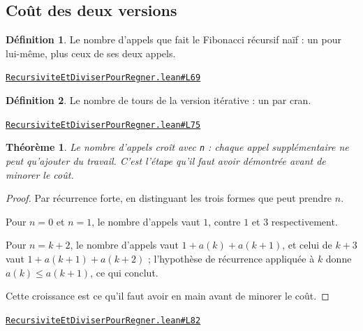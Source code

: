 \documentclass[11pt,a4paper]{article}
\theoremstyle{definition}
\newtheorem{definition}{Définition}
\theoremstyle{plain}
\newtheorem{theoreme}{Théorème}
\newcommand{\source}[2]{\par\smallskip\noindent\hfill{\footnotesize\href{#1}{\texttt{#2}}}\par\smallskip}
\begin{document}
\subsection{Coût des deux versions}

\begin{definition}
Le nombre d'appels que fait le Fibonacci récursif naïf : un pour lui-même, plus
ceux de ses deux appels.
\end{definition}
\source{https://github.com/Commutator-IO/learn-lean/blob/main/courses/02-lycee/11-informatique-nsi/RecursiviteEtDiviserPourRegner.lean\#L69}{RecursiviteEtDiviserPourRegner.lean\#L69}

\begin{definition}
Le nombre de tours de la version itérative : un par cran.
\end{definition}
\source{https://github.com/Commutator-IO/learn-lean/blob/main/courses/02-lycee/11-informatique-nsi/RecursiviteEtDiviserPourRegner.lean\#L75}{RecursiviteEtDiviserPourRegner.lean\#L75}

\begin{theoreme}
Le nombre d'appels croît avec \texttt{n} : chaque appel supplémentaire ne peut
qu'ajouter du travail. C'est l'étape qu'il faut avoir démontrée avant de minorer le
coût.
\end{theoreme}
\begin{proof}
Par récurrence forte, en distinguant les trois formes que peut prendre \(n\).

Pour \(n = 0\) et \(n = 1\), le nombre d'appels vaut \(1\), contre \(1\) et \(3\)
respectivement.

Pour \(n = k+2\), le nombre d'appels vaut \(1 + a(k) + a(k+1)\), et celui de \(k+3\)
vaut \(1 + a(k+1) + a(k+2)\) ; l'hypothèse de récurrence appliquée à \(k\) donne
\(a(k) \le a(k+1)\), ce qui conclut.

Cette croissance est ce qu'il faut avoir en main avant de minorer le coût.
\end{proof}
\source{https://github.com/Commutator-IO/learn-lean/blob/main/courses/02-lycee/11-informatique-nsi/RecursiviteEtDiviserPourRegner.lean\#L82}{RecursiviteEtDiviserPourRegner.lean\#L82}
\end{document}

